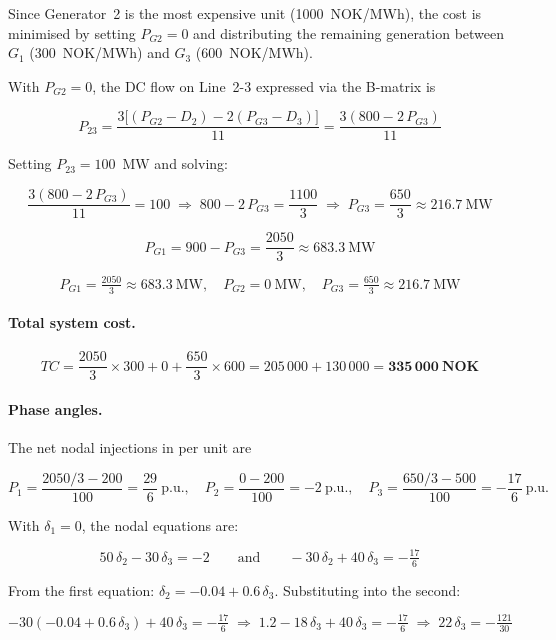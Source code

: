 Since Generator~2 is the most expensive unit (1000~NOK/MWh), the cost is
minimised by setting $P_{G2} = 0$ and distributing the remaining generation
between $G_1$ (300~NOK/MWh) and $G_3$ (600~NOK/MWh).

With $P_{G2} = 0$, the DC flow on Line~2-3 expressed via the B-matrix is

\[
  P_{23} = \frac{3\bigl[(P_{G2} - D_2) - 2(P_{G3} - D_3)\bigr]}{11}
         = \frac{3(800 - 2\,P_{G3})}{11}
\]

Setting $P_{23} = 100$~MW and solving:

\[
  \frac{3(800 - 2\,P_{G3})}{11} = 100
  \;\Rightarrow\; 800 - 2\,P_{G3} = \frac{1100}{3}
  \;\Rightarrow\; P_{G3} = \frac{650}{3} \approx 216.7~\text{MW}
\]

\[
  P_{G1} = 900 - P_{G3} = \frac{2050}{3} \approx 683.3~\text{MW}
\]

\[
  \boxed{P_{G1} = \tfrac{2050}{3} \approx 683.3~\text{MW},\quad
         P_{G2} = 0~\text{MW},\quad
         P_{G3} = \tfrac{650}{3} \approx 216.7~\text{MW}}
\]

\paragraph{Total system cost.}

\[
  TC = \frac{2050}{3}\times 300 + 0 + \frac{650}{3}\times 600
     = 205\,000 + 130\,000
     = \mathbf{335\,000~\text{NOK}}
\]

\paragraph{Phase angles.}

The net nodal injections in per unit are

\[
  P_1 = \frac{2050/3 - 200}{100} = \frac{29}{6}~\text{p.u.},\quad
  P_2 = \frac{0 - 200}{100} = -2~\text{p.u.},\quad
  P_3 = \frac{650/3 - 500}{100} = -\frac{17}{6}~\text{p.u.}
\]

With $\delta_1 = 0$, the nodal equations are:

\[
  50\,\delta_2 - 30\,\delta_3 = -2
  \qquad\text{and}\qquad
  -30\,\delta_2 + 40\,\delta_3 = -\tfrac{17}{6}
\]

From the first equation: $\delta_2 = -0.04 + 0.6\,\delta_3$.
Substituting into the second:

\[
  -30(-0.04 + 0.6\,\delta_3) + 40\,\delta_3 = -\tfrac{17}{6}
  \;\Rightarrow\; 1.2 - 18\,\delta_3 + 40\,\delta_3 = -\tfrac{17}{6}
  \;\Rightarrow\; 22\,\delta_3 = -\tfrac{121}{30}
\]

